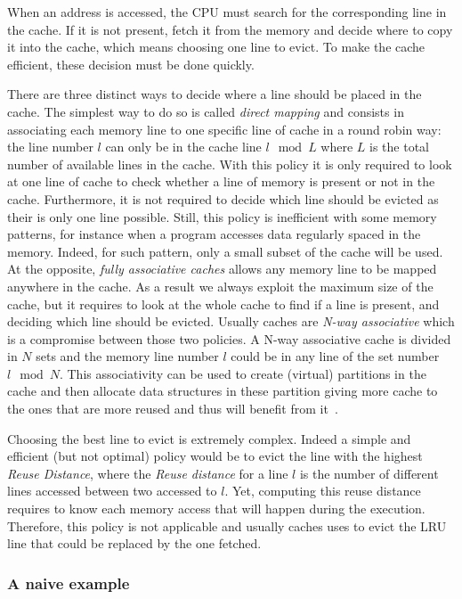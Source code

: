 When an address is accessed, the \gls{CPU} must search for the corresponding line in the cache.
If it is not present, fetch it from the memory and decide where to copy it into the cache, which means choosing one line to evict.
To make the cache efficient, these decision must be done quickly.

There are three distinct ways to decide where a line should be placed in the cache.
The simplest way to do so is called \emph{direct mapping} and consists in associating each memory line to one specific line of cache in a round robin way: the line number $l$ can only be in the cache line $l \mod L$ where $L$ is the total number of available lines in the cache.
With this policy it is only required to look at one line of cache to check whether a line of memory is present or not in the cache.
Furthermore, it is not required to decide which line should be evicted as their is only one line possible.
Still, this policy is inefficient with some memory patterns, for instance when a program accesses data regularly spaced in the memory.
Indeed, for such pattern, only a small subset of the cache will be used.
At the opposite, \emph{fully associative caches} allows any memory line to be mapped anywhere in the cache.
As a result we always exploit the maximum size of the cache, but it requires to look at the whole cache to find if a line is present, and deciding which line should be evicted.
Usually caches are \emph{N-way associative} which is a compromise between those two policies.
A N-way associative cache is divided in $N$ sets and the memory line number $l$ could be in any line of the set number $l \mod N$.
This associativity can be used to create (virtual) partitions in the cache and then allocate data structures in these partition giving more cache to the ones that are more reused and thus will benefit from it~\cite{Perarnau11Controlling}.

Choosing the best line to evict is extremely complex.
Indeed a simple and efficient (but not optimal) policy would be to evict the line with the highest \emph{Reuse Distance}, where the \emph{Reuse distance} for a line $l$ is the number of different lines accessed between two accessed to $l$.
Yet, computing this reuse distance requires to know each memory access that will happen during the execution.
Therefore, this policy is not applicable and usually caches uses to evict the \acrfull{LRU} line that could be replaced by the one fetched.

\subsubsection{A naive example}

